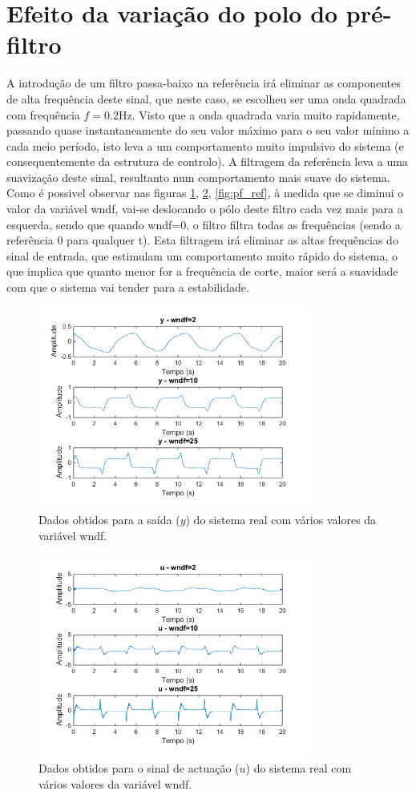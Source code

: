\documentclass[%
  reprint,
  nofootinbib,
  amsmath,amssymb,
  aps,
  10pt,
  a4paper
]{revtex4-1}
\begin{document}
\section{Efeito da variação do polo do pré-filtro}
A introdução de um filtro passa-baixo na referência irá eliminar as componentes de alta frequência deste sinal, que neste caso, se escolheu ser uma onda quadrada com frequência $f=0.2$Hz. Visto que a onda quadrada varia muito rapidamente, passando quase instantaneamente do seu valor máximo para o seu valor mínimo a cada meio período, isto leva a um comportamento muito impulsivo do sistema (e consequentemente da estrutura de controlo). A filtragem da referência leva a uma suavização deste sinal, resultanto num comportamento mais suave do sistema.\\
Como é possivel observar nas figuras \ref{fig:pf_y}, \ref{fig:pf_u}, \ref{fig:pf_ref}, à medida que se diminui o valor da variável wndf, vai-se deslocando o pólo deste filtro cada vez mais para a esquerda, sendo que quando wndf=0, o filtro filtra todas as frequências (sendo a referência 0 para qualquer t). Esta filtragem irá eliminar as altas frequências do sinal de entrada, que estimulam um comportamento muito rápido do sistema, o que implica que quanto menor for a frequência de corte, maior será a suavidade com que o sistema vai tender para a estabilidade.
\begin{figure}[H]
\includegraphics[width=3.5in]{../img/y_filtro.png}
\caption{Dados obtidos para a saída ($y$) do sistema real com vários valores da variável wndf.}
\label{fig:pf_y}
\end{figure}
\begin{figure}[H]
\includegraphics[width=3.5in]{../img/u_filtro.png}
\caption{Dados obtidos para o sinal de actuação ($u$) do sistema real com vários valores da variável wndf.}
\label{fig:pf_u}
\end{figure}
\end{document}
